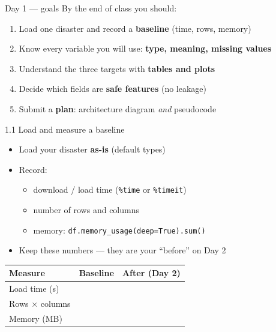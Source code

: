 \documentclass[aspectratio=43,11pt]{beamer}
\begin{document}
\begin{frame}{Day 1 --- goals}
  By the end of class you should:
  \vspace{0.5em}
  \begin{enumerate}
    \item Load one disaster and record a \textbf{baseline}
          (time, rows, memory)
    \item Know every variable you will use: \textbf{type, meaning, missing values}
    \item Understand the three targets with \textbf{tables and plots}
    \item Decide which fields are \textbf{safe features} (no leakage)
    \item Submit a \textbf{plan}: architecture diagram \emph{and} pseudocode
  \end{enumerate}
\end{frame}

\begin{frame}{1.1 Load and measure a baseline}
  \begin{itemize}
    \item Load your disaster \textbf{as-is} (default types)
    \item Record:
      \begin{itemize}
        \item download / load time (\texttt{\%time} or \texttt{\%timeit})
        \item number of rows and columns
        \item memory: \texttt{df.memory\_usage(deep=True).sum()}
      \end{itemize}
    \item Keep these numbers --- they are your ``before'' on Day 2
  \end{itemize}
  \vspace{0.8em}
  \begin{center}
  \begin{tabular}{@{}lll@{}}
    \toprule
    Measure & Baseline & After (Day 2) \\
    \midrule
    Load time (s) & & \\
    Rows $\times$ columns & & \\
    Memory (MB) & & \\
    \bottomrule
  \end{tabular}
  \end{center}
\end{frame}
\end{document}
